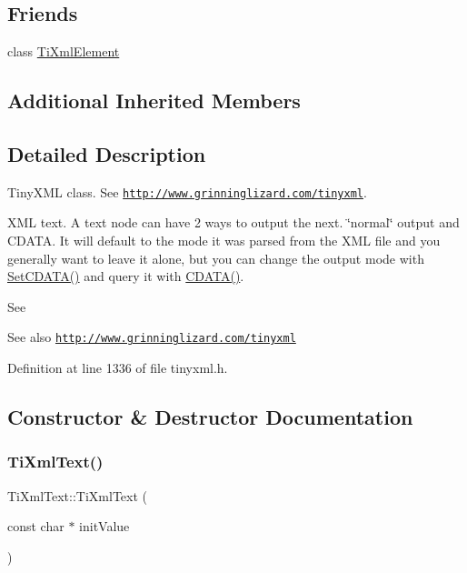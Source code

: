 \subsection*{Friends}
\begin{DoxyCompactItemize}
\item 
class \hyperlink{class_ti_xml_text_ab6592e32cb9132be517cc12a70564c4b}{Ti\+Xml\+Element}
\end{DoxyCompactItemize}
\subsection*{Additional Inherited Members}


\subsection{Detailed Description}
Tiny\+X\+ML class. See \href{http://www.grinninglizard.com/tinyxml}{\tt http\+://www.\+grinninglizard.\+com/tinyxml}. 

X\+ML text. A text node can have 2 ways to output the next. \char`\"{}normal\char`\"{} output and C\+D\+A\+TA. It will default to the mode it was parsed from the X\+ML file and you generally want to leave it alone, but you can change the output mode with \hyperlink{class_ti_xml_text_acb17ff7c5d09b2c839393445a3de5ea9}{Set\+C\+D\+A\+T\+A()} and query it with \hyperlink{class_ti_xml_text_aac1f4764d220ed6bf809b16dfcb6b45a}{C\+D\+A\+T\+A()}.

See \begin{DoxySeeAlso}{See also}
\href{http://www.grinninglizard.com/tinyxml}{\tt http\+://www.\+grinninglizard.\+com/tinyxml} 
\end{DoxySeeAlso}


Definition at line 1336 of file tinyxml.\+h.



\subsection{Constructor \& Destructor Documentation}
\hypertarget{class_ti_xml_text_af659e77c6b87d684827f35a8f4895960}{}\label{class_ti_xml_text_af659e77c6b87d684827f35a8f4895960} 
\subsubsection{\texorpdfstring{Ti\+Xml\+Text()}{TiXmlText()}\hspace{0.1cm}{\footnotesize\ttfamily [1/3]}}
{\footnotesize\ttfamily Ti\+Xml\+Text\+::\+Ti\+Xml\+Text (\begin{DoxyParamCaption}\item[{const char $\ast$}]{init\+Value }\end{DoxyParamCaption})\hspace{0.3cm}{\ttfamily [inline]}}

